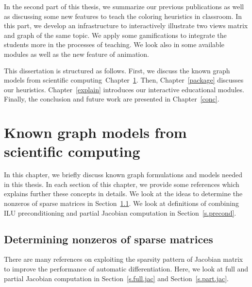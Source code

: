 \documentclass[12pt, twoside,a4paper,toc=bibliography]{scrbook}
\newcommand{\secref}[1]{Section~\protect\ref{#1}}
\newcommand{\chapref}[1]{Chapter~\protect\ref{#1}}
\begin{document}
In the second part of this thesis, we summarize our previous publications
\cite{2013:05,2014:01,2014:02,2014:09,2015:3,cscpaper} as well as discussing some new features
to teach the coloring heuristics in classroom. In this part, we develop an infrastructure
to interactively illustrate two views matrix and graph of the same topic. 
We apply some gamifications to integrate the students more in the processes of teaching.
We look also in some available modules as well as the new feature of animation.

This dissertation is structured as follows.
First, we discuss the known graph models from scientific computing~\chapref{prel}.
Then, \chapref{package} discusses our heuristics.
\chapref{explain} introduces our interactive educational modules.
Finally, the conclusion and future work are presented in \chapref{conc}.

\chapter{Known graph models from scientific computing}
\label{prel}
In this chapter, we briefly discuss known graph formulations and
models needed in this thesis. In each section of this chapter,
we provide some references which explains further these concepts in details.
We look at the ideas to determine the nonzeros of sparse matrices in
\secref{s.det.nonzero}.
We look at definitions of combining ILU preconditioning and 
partial Jacobian computation in \secref{s.precond}.

\section{Determining nonzeros of sparse matrices}
\label{s.det.nonzero}
There are many references on exploiting the sparsity pattern of Jacobian matrix
to improve the performance of automatic differentiation.
Here, we look at full and partial Jacobian computation in
\secref{s.full.jac} and \secref{s.part.jac}.
\end{document}
